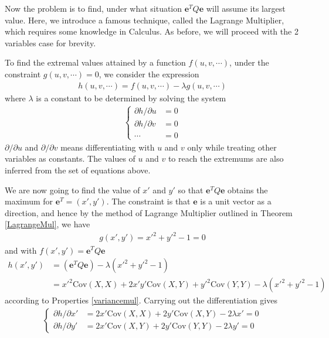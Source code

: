 Now the problem is to find, under what situation $\textbf{e}^T Q \textbf{e}$ will assume its largest value. Here, we introduce a famous technique, called the Lagrange Multiplier, which requires some knowledge in Calculus. As before, we will proceed with the 2 variables case for brevity.
\begin{thm}
\label{LagrangeMul}
To find the extremal values attained by a function $f(u,v,\cdots)$, under the constraint $g(u,v,\cdots) = 0$, we consider the expression
\begin{align*}
h(u,v,\cdots) = f(u,v,\cdots) - \lambda g(u,v,\cdots)
\end{align*}
where $\lambda$ is a constant to be determined by solving the system
\begin{align*}
\begin{cases}
\partial h/\partial u &= 0 \\
\partial h/\partial v &= 0 \\
\cdots &= 0
\end{cases}
\end{align*}
$\partial/\partial u$ and $\partial/\partial v$ means differentiating with $u$ and $v$ only while treating other variables as constants. The values of $u$ and $v$ to reach the extremums are also inferred from the set of equations above. 
\end{thm}
We are now going to find the value of $x'$ and $y'$ so that $\textbf{e}^T Q \textbf{e}$ obtains the maximum for $\textbf{e}^T = (x',y')$. The constraint is that $\textbf{e}$ is a unit vector as a direction, and hence by the method of Lagrange Multiplier outlined in Theorem \ref{LagrangeMul}, we have
\begin{align*}
g(x',y') = x'^2 + y'^2 - 1 = 0
\end{align*}
and with $f(x',y') = \textbf{e}^T Q \textbf{e}$
\begin{align*}
h(x',y') &= (\textbf{e}^T Q \textbf{e}) - \lambda(x'^2 + y'^2 - 1) \\
&= x'^2 \text{Cov}(X, X) + 2x'y' \text{Cov}(X, Y) + y'^2\text{Cov}(Y, Y) - \lambda(x'^2 + y'^2 - 1)
\end{align*}
according to Properties \ref{variancemul}. Carrying out the differentiation gives
\begin{align*}
\begin{cases}
\partial h/\partial x' &= 2x'\text{Cov}(X, X) + 2y'\text{Cov}(X, Y) - 2\lambda x' = 0 \\
\partial h/\partial y' &= 2x'\text{Cov}(X, Y) + 2y'\text{Cov}(Y, Y) - 2\lambda y' = 0
\end{cases}    
\end{align*}
